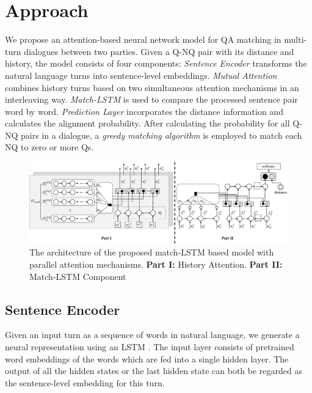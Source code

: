 \section{Approach}
\label{sec:method}

We propose an attention-based neural network model for QA matching 
in multi-turn dialogues between two parties. 
Given a Q-NQ pair with its distance and history, 
the model consists of four components: 
\textit{Sentence Encoder} transforms the natural language turns into 
sentence-level embeddings. \textit{Mutual Attention} combines history turns 
based on two simultaneous attention mechanisms in an interleaving way. 
\textit{Match-LSTM} is used to compare the processed sentence pair word by word. 
\textit{Prediction Layer} incorporates the distance information 
and calculates the alignment probability. After calculating the probability for 
all Q-NQ pairs in a dialogue, a \textit{greedy matching algorithm} is employed to
match each NQ to zero or more Qs.

\begin{figure}
	\centering
	\includegraphics[scale=0.38]{pictures/figure4.eps}
	\caption{The architecture of the proposed match-LSTM based model with parallel attention mechanisms. \textbf{Part I:} History Attention. \textbf{Part II:} Match-LSTM Component}
	
	\label{fig:model1}
\end{figure}

\subsection{Sentence Encoder}
\label{sec:sentence-encoder}

Given an input turn as a sequence of words in natural language, we generate a neural representation using an LSTM \cite{gers1999learning}. The input layer consists of pretrained word embeddings of the words which are fed into a single hidden layer. The output of all the hidden states or the last hidden state can both be regarded as the sentence-level embedding for this turn.

